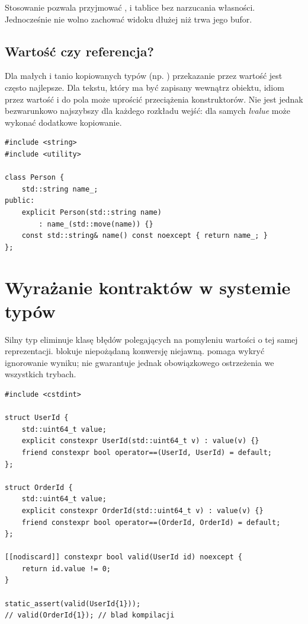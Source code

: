 Stosowanie  pozwala przyjmować
,  i tablice bez narzucania własności.
Jednocześnie nie wolno zachować widoku dłużej niż trwa jego bufor.

\subsection{Wartość czy referencja?}

Dla małych i tanio kopiowanych typów (np. ) przekazanie przez
wartość jest często najlepsze. Dla tekstu, który ma być zapisany
wewnątrz obiektu, idiom  przez wartość i
 do pola może uprościć przeciążenia konstruktorów.
Nie jest jednak bezwarunkowo najszybszy dla każdego rozkładu wejść:
dla samych \emph{lvalue} może wykonać dodatkowe kopiowanie.

\begin{lstlisting}[caption={Jeden konstruktor obslugujacy lvalue i rvalue (C++11).}]
#include <string>
#include <utility>

class Person {
    std::string name_;
public:
    explicit Person(std::string name)
        : name_(std::move(name)) {}
    const std::string& name() const noexcept { return name_; }
};
\end{lstlisting}

\section{Wyrażanie kontraktów w systemie typów}
\label{sec:cpp20-contracts}

Silny typ eliminuje klasę błędów polegających na pomyleniu wartości o
tej samej reprezentacji.  blokuje niepożądaną konwersję
niejawną. \code{[[nodiscard]]} pomaga wykryć ignorowanie wyniku;
nie gwarantuje jednak obowiązkowego ostrzeżenia we wszystkich trybach.

\begin{lstlisting}[caption={Strong types rozrozniajace dwa identyfikatory (C++20).}]
#include <cstdint>

struct UserId {
    std::uint64_t value;
    explicit constexpr UserId(std::uint64_t v) : value(v) {}
    friend constexpr bool operator==(UserId, UserId) = default;
};

struct OrderId {
    std::uint64_t value;
    explicit constexpr OrderId(std::uint64_t v) : value(v) {}
    friend constexpr bool operator==(OrderId, OrderId) = default;
};

[[nodiscard]] constexpr bool valid(UserId id) noexcept {
    return id.value != 0;
}

static_assert(valid(UserId{1}));
// valid(OrderId{1}); // blad kompilacji
\end{lstlisting}

